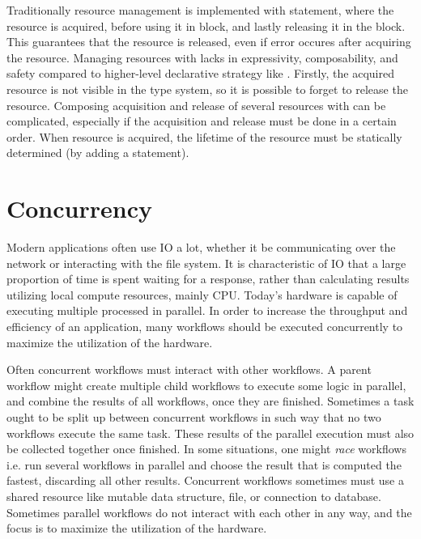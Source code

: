 Traditionally resource management is implemented with  statement, where the resource is acquired, before using it in  block, and lastly releasing it in the  block. This guarantees that the resource is released, even if error occures after acquiring the resource. Managing resources with  lacks in expressivity, composability, and safety compared to higher-level declarative strategy like . Firstly, the acquired resource is not visible in the type system, so it is possible to forget to release the resource. Composing acquisition and release of several resources with  can be complicated, especially if the acquisition and release must be done in a certain order. When resource is acquired, the lifetime of the resource must be statically determined (by adding a  statement).



\section{Concurrency}
Modern applications often use IO a lot, whether it be communicating over the network or interacting with the file system. It is characteristic of IO that a large proportion of time is spent waiting for a response, rather than calculating results utilizing local compute resources, mainly CPU. Today's hardware is capable of executing multiple processed in parallel. In order to increase the throughput and efficiency of an application, many workflows should be executed concurrently to maximize the utilization of the hardware.

Often concurrent workflows must interact with other workflows. A parent workflow might create multiple child workflows to execute some logic in parallel, and combine the results of all workflows, once they are finished. Sometimes a task ought to be split up between concurrent workflows in such way that no two workflows execute the same task. These results of the parallel execution must also be collected together once finished. In some situations, one might \textit{race} workflows i.e. run several workflows in parallel and choose the result that is computed the fastest, discarding all other results. Concurrent workflows sometimes must use a shared resource like mutable data structure, file, or connection to database. Sometimes parallel workflows do not interact with each other in any way, and the focus is to maximize the utilization of the hardware.


